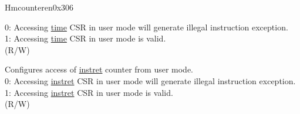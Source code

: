 \begin{register}{H}{mcounteren}{0x306}
\begin{regdesc}
\begin{reglist}
0: Accessing \hyperref[regdesc:TIME]{time} CSR in user mode will generate illegal instruction exception. \\
1: Accessing \hyperref[regdesc:TIME]{time} CSR in user mode is valid. \\
(R/W)  \\
\label{fielddesc:MCOUNTEREN_IR}\item [IR] Configures access of \hyperref[regdesc:INSTRET]{instret} counter from user mode. \\
0: Accessing \hyperref[regdesc:INSTRET]{instret} CSR in user mode will generate illegal instruction exception. \\
1: Accessing \hyperref[regdesc:INSTRET]{instret} CSR in user mode is valid. \\
(R/W)
\end{reglist}\end{regdesc}
\end{register}

